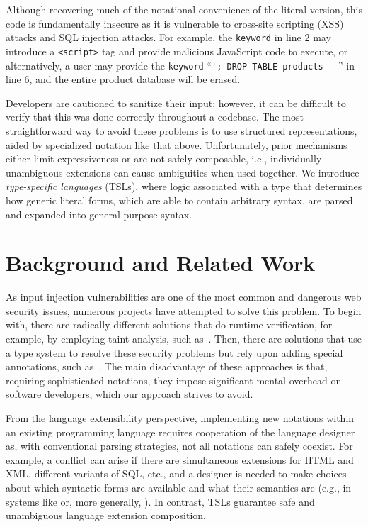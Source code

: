\documentclass{sig-alternate}
\newcommand{\qs}[1]{}%
\let\li\lstinline
\begin{document}
Although recovering much of the notational convenience of the literal version, this code is fundamentally insecure as it is vulnerable to cross-site scripting (XSS) attacks and SQL injection attacks. For example, the \li{keyword} in line 2 may introduce a \li{<script>} tag and provide malicious JavaScript code to execute, or alternatively, a user may provide the \li{keyword} ``\li{'; DROP TABLE products --}'' in line 6, and the entire product database will be erased.

Developers are cautioned to sanitize their input; however, it can be difficult to verify that this was done correctly throughout a codebase. The most straightforward way to avoid these problems is to use structured representations, aided by specialized notation like that above. Unfortunately, prior mechanisms either limit expressiveness or are not safely composable, i.e., individually-unambiguous extensions can cause ambiguities when used together. We introduce \emph{type-specific languages} (TSLs), where  logic associated with a type that determines how generic literal forms, which are able to contain arbitrary syntax, are parsed and expanded into general-purpose syntax.

\section{Background and Related Work}
\qs{Describe the specialized (but pertinent) background necessary to appreciate the work. Include references to the literature where appropriate, and briefly explain where your work departs from that done by others.}

As input injection vulnerabilities are one of the most common and dangerous web security issues, numerous projects have attempted to solve this problem. To begin with, there are radically different solutions that do runtime verification, for example, by employing taint analysis, such as~\cite{fortify,PLAS12,livshits13,scriptgard}. Then, there are solutions that use a type system to resolve these security problems but rely upon adding special annotations, such as~\cite{ur/Web,swift,corcoran09selinks}. The main disadvantage of these approaches is that, requiring sophisticated notations, they impose significant mental overhead on software developers, which our approach strives to avoid.

From the language extensibility perspective, implementing new notations within an existing programming language requires cooperation of the language designer as, with conventional parsing strategies, not all notations can safely coexist. For example, a conflict can arise if there are simultaneous extensions for HTML and XML, different variants of SQL, etc., and a designer is needed to make choices about which syntactic forms are available and what their semantics are (e.g., in systems like \cite{Erdweg:2011:SLL:2048147.2048199} or, more generally, \cite{Erdweg:2013:FEL:2517208.2517210}). In contrast, TSLs guarantee safe and unambiguous language extension composition.
\end{document}
